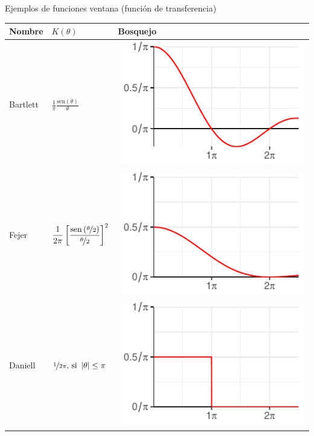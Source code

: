 \documentclass[12pt,letterpaper,draft]{book}
\newcommand{\SEN}[1]{\mathrm{sen}\left( #1 \right)}
\newcommand{\abso}[1]{\left| #1 \right|}
\begin{document}
\begin{SidewaysTable}
\caption{Ejemplos de funciones ventana (función de transferencia)}
\centering
\begin{tabular}{lll}
\toprule
Nombre & $K(\theta)$ & Bosquejo \\
\midrule
Bartlett &
$\displaystyle 
\frac{1}{\pi} \frac{\SEN{\theta}}{\theta}
$
& \includegraphics[scale=.4]{./img_ventanas/ventana_2_bartlett.pdf} \\
\rowcolor{gris}
Fejer &
$\displaystyle 
\frac{1}{2\pi} \left[ \frac{\SEN{\nicefrac{\theta}{2}}}{\nicefrac{\theta}{2}} \right]^{2}
$
& \includegraphics[scale=.4]{./img_ventanas/ventana_2_fejer.pdf} \\
Daniell &
$
\displaystyle 
\nicefrac{1}{2\pi} \text{, si } \abso{\theta}\leq \pi
$
& \includegraphics[scale=.4]{./img_ventanas/ventana_2_daniell.pdf} \\

\end{tabular}
\end{SidewaysTable}
\end{document}
